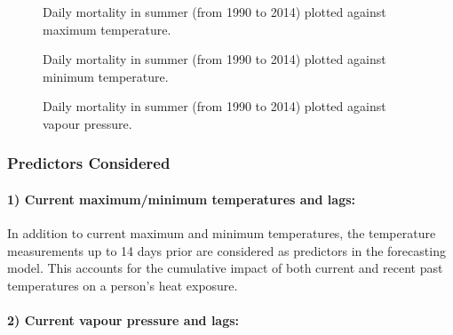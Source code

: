 \documentclass[
  11pt,
  a4paper,
]{article}
\begin{document}
\begin{figure}


\caption{\label{fig-Tmax}Daily mortality in summer (from 1990 to 2014)
plotted against maximum temperature.}

\end{figure}%

\begin{figure}


\caption{\label{fig-Tmin}Daily mortality in summer (from 1990 to 2014)
plotted against minimum temperature.}

\end{figure}%

\begin{figure}


\caption{\label{fig-Vp}Daily mortality in summer (from 1990 to 2014)
plotted against vapour pressure.}

\end{figure}%

\pagebreak[3]

\subsubsection{Predictors Considered}\label{predictors-considered}

\paragraph{1) Current maximum/minimum temperatures and
lags:}\label{current-maximumminimum-temperatures-and-lags}

In addition to current maximum and minimum temperatures, the temperature
measurements up to 14 days prior are considered as predictors in the
forecasting model. This accounts for the cumulative impact of both
current and recent past temperatures on a person's heat exposure.

\paragraph{2) Current vapour pressure and
lags:}\label{current-vapour-pressure-and-lags}
\end{document}
